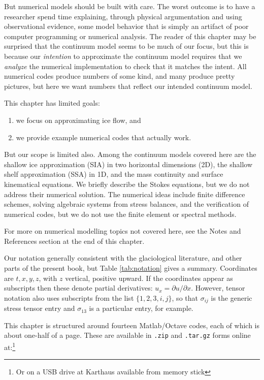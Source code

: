 \documentclass[titlepage,letterpaper,final,12pt]{scrartcl}
\begin{document}
But numerical models should be built with care.  The worst outcome is to have a researcher spend time explaining, through physical argumentation and using observational evidence, some model behavior that is simply an artifact of poor computer programming or numerical analysis.  The reader of this chapter may be surprised that the continuum model seems to be much of our focus, but this is because our \emph{intention} to approximate the continuum model requires that we \emph{analyze} the numerical implementation to check that it matches the intent.  All numerical codes produce numbers of some kind, and many produce pretty pictures, but here we want numbers that reflect our intended continuum model.

This chapter has limited goals:
  \begin{enumerate}
  \item we focus on approximating ice flow, and
  \item we provide example numerical codes that actually work.
  \end{enumerate}
But our scope is limited also.  Among the continuum models covered here are the shallow ice approximation (SIA) in two horizontal dimensions (2D), the shallow shelf approximation (SSA) in 1D, and the mass continuity and surface kinematical equations.  We briefly describe the Stokes equations, but we do not address their numerical solution.  The numerical ideas include finite difference schemes, solving algebraic systems from stress balances, and the verification of numerical codes, but we do not use the finite element or spectral methods.

For more on numerical modelling topics not covered here, see the Notes and References section at the end of this chapter.

Our notation generally consistent with the glaciological literature, and other parts of the present book, but Table \ref{tab:notation} gives a summary.  Coordinates are $t,x,y,z$, with $z$ vertical, positive upward.  If the coordinates appear as subscripts then these denote partial derivatives: $u_x = \partial u/\partial x$.  However, tensor notation also uses subscripts from the list $\{1,2,3,i,j\}$, so that $\sigma_{ij}$ is the generic stress tensor entry and $\sigma_{13}$ is a particular entry, for example.

This chapter is structured around fourteen Matlab/Octave codes, each of which is about one-half of a page.  These are available in \texttt{.zip} and \texttt{.tar.gz} forms online at:\footnote{Or on a USB drive at Karthaus available from memory stick}
\end{document}
